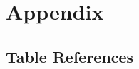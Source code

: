 \documentclass[twocolumn]{aastex631}
\begin{document}





\newpage
\appendix
\section{Appendix}



\subsection{Table References}

\end{document}
